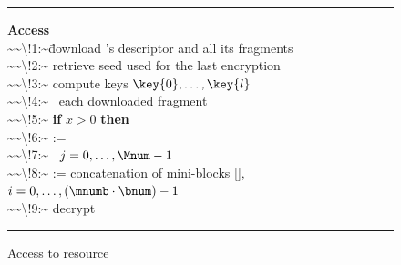 \begin{figure}[!t]
\begin{scriptsize}
\hrule          %
\vspace{0.12cm}
\begin{tabbing}
{\bf Access}\\
\num{~~\!1:~}\= download \resource's descriptor and all its fragments \\
\num{~~\!2:~}\1 retrieve seed  used for the last encryption \\
\num{~~\!3:~}\1 compute keys $\key{0},\ldots,\key{l}$\\
\num{~~\!4:~}\1 \myfor\  each downloaded fragment   \\
\num{~~\!5:~}\2     {\bf if} $x>0$ {\bf then} \\
\num{~~\!6:~}\2      :=  \\
\num{~~\!7:~}\1 \myfor\ $j=0,\ldots,\Mnum-1$  \\
\num{~~\!8:~}\2      := concatenation of mini-blocks [], $i=0,\ldots, (\mnumb \cdot \bnum)-1$\\
\num{~~\!9:~}\2     decrypt 
\end{tabbing}
\vspace{-0.3cm}
\hrule
\end{scriptsize}
\caption{\label{ms:fig:access}Access to resource \resource}
\end{figure}

